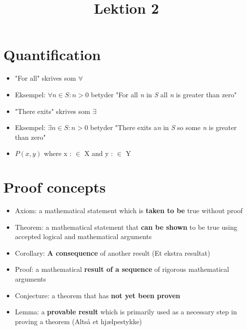 \documentclass[danish,english,10pt,a4paper]{article}
\title{Lektion 2}
\begin{document}
\maketitle


\section*{Quantification}


\begin{theo} 
\begin{itemize}
\item "For all" skrives som $\forall$
\item[] Eksempel: $\forall n \in S: n>0$ betyder "For all \textit{n} in \textit{S} all \textit{n} is greater than zero"
\end{itemize}
\end{theo}





\begin{theo} 
\begin{itemize}
\item "There exits" skrives som $\exists$
\item[] Eksempel: $\exists n \in S: n>0$ betyder "There exits a\textit{n} in \textit{S} so some \textit{n} is greater than zero"
\end{itemize}
\end{theo}




\begin{theo} 
\begin{itemize}
\item $P(x, y)$ where x : $\in$ X and y : $\in$ Y
\end{itemize}
\end{theo}



\newpage
\section*{Proof concepts}
\begin{theo}[•] 
\begin{itemize}
\item Axiom: a mathematical statement which is \textbf{taken to be }true without proof
\item Theorem: a mathematical statement that \textbf{can be shown} to be true using accepted logical and mathematical arguments
\item Corollary: \textbf{A consequence} of another result (Et ekstra resultat)
\item Proof: a mathematical \textbf{result of a sequence} of rigorous mathematical arguments
\item Conjecture: a theorem that has \textbf{not yet been proven}
\item Lemma: a \textbf{provable result }which is primarily used as a necessary step in proving a theorem (Altså et hjælpestykke)
\end{itemize}
\end{theo}
\end{document}
